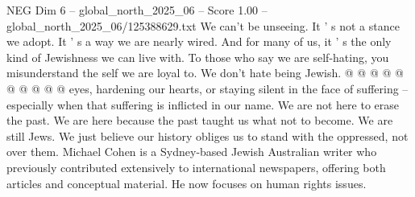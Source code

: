 \begin{textsample}{NEG Dim 6 – global\_north\_2025\_06 – Score 1.00 – global\_north\_2025\_06/125388629.txt}
We can't be unseeing.
It ' s not a stance we adopt.
It ' s a way we are nearly wired.
And for many of us, it ' s the only kind of Jewishness we can live with.
To those who say we are self-hating, you misunderstand the self we are loyal to.
We don't hate being Jewish. @ @ @ @ @ @ @ @ @ @ eyes, hardening our hearts, or staying silent in the face of suffering -- especially when that suffering is inflicted in our name.
We are not here to erase the past.
We are here because the past taught us what not to become.
We are still Jews.
We just believe our history obliges us to stand with the oppressed, not over them.
Michael Cohen is a Sydney-based Jewish Australian writer who previously contributed extensively to international newspapers, offering both articles and conceptual material.
He now focuses on human rights issues.

\end{textsample}
